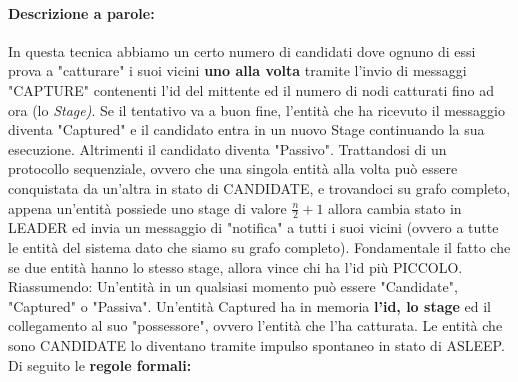 \paragraph{Descrizione a parole:}
In questa tecnica abbiamo un certo numero di candidati dove ognuno di essi prova
a "catturare" i suoi vicini \textbf{uno alla volta} tramite l'invio di messaggi
"CAPTURE" contenenti l'id del mittente ed il numero di nodi catturati fino ad
ora (lo \textit{Stage)}. Se il tentativo va a buon fine, l'entità che ha
ricevuto il messaggio diventa "Captured" e il candidato entra in un nuovo Stage
continuando la sua esecuzione. Altrimenti il candidato diventa "Passivo".
Trattandosi di un protocollo sequenziale, ovvero che una singola entità alla
volta può essere conquistata da un'altra in stato di CANDIDATE, e trovandoci su
grafo completo, appena un'entità possiede uno stage di valore $\frac{n}{2} +1 $
allora cambia stato in LEADER ed invia un messaggio di "notifica" a tutti i suoi
vicini (ovvero a tutte le entità del sistema dato che siamo su grafo completo).
Fondamentale il fatto che se due entità hanno lo stesso stage, allora vince chi
ha l'id più PICCOLO.\\
Riassumendo: Un'entità in un qualsiasi momento può essere "Candidate",
"Captured" o "Passiva". Un'entità Captured ha in memoria \textbf{l'id, lo stage}
ed il collegamento al suo "possessore", ovvero l'entità che l'ha catturata. Le
entità che sono CANDIDATE lo diventano tramite impulso spontaneo in stato di
ASLEEP. Di seguito le \textbf{regole formali:}
